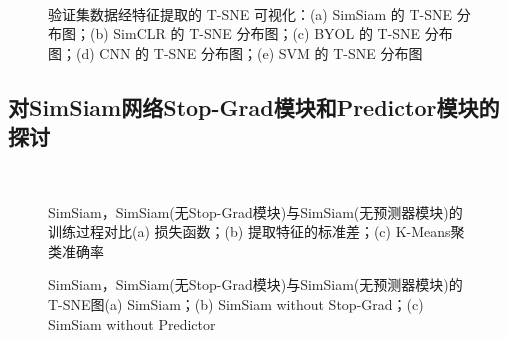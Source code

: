 \documentclass[master]{thesis-uestc}
\begin{document}
\begin{figure}
    \centering
    \\
    \caption{验证集数据经特征提取的 T-SNE 可视化：(a) SimSiam 的 T-SNE 分布图；(b) SimCLR 的 T-SNE 分布图；(c) BYOL 的 T-SNE 分布图；(d) CNN 的 T-SNE 分布图；(e) SVM 的 T-SNE 分布图}
    \label{tsne_of_all_models}
\end{figure}

\subsection{对SimSiam网络Stop-Grad模块和Predictor模块的探讨}
\label{sec:discuss_of_simsiam_module}

\begin{figure}
    \centering
    \\
    \caption{SimSiam，SimSiam(无Stop-Grad模块)与SimSiam(无预测器模块)的训练过程对比(a) 损失函数；(b) 提取特征的标准差；(c) K-Means聚类准确率}
    \label{train_process_simsiam_discuss}
\end{figure}

\begin{figure}
    \centering
    \caption{SimSiam，SimSiam(无Stop-Grad模块)与SimSiam(无预测器模块)的T-SNE图(a) SimSiam；(b) SimSiam without Stop-Grad；(c) SimSiam without Predictor}
    \label{tsne_simsiam_discuss}
\end{figure}
\end{document}
